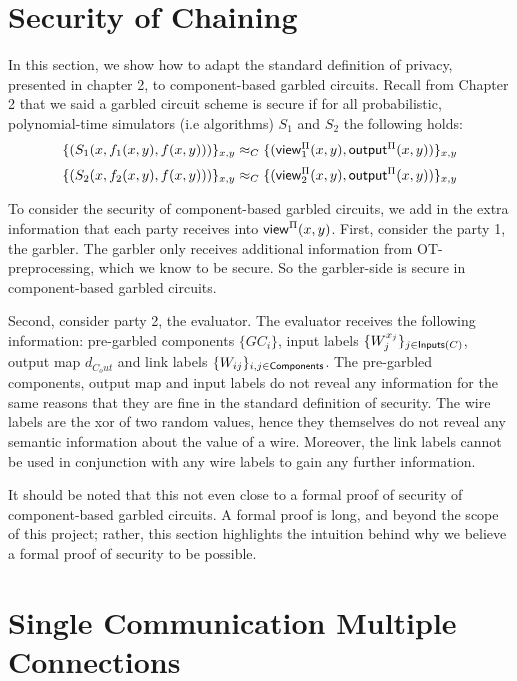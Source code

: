 \section{Security of Chaining}

In this section, we show how to adapt the standard definition of privacy, presented in chapter 2, to component-based garbled circuits.
Recall from Chapter 2 that we said a garbled circuit scheme is secure if for all probabilistic, polynomial-time simulators (i.e algorithms) $S_1$ and $S_2$ the following holds:
\begin{equation}
    \{(S_1(x, f_1(x,y), f(x,y)))\}_{x,y} \approx_C \{({\sf view}^{\Pi}_1(x,y), {\sf output}^{\Pi}(x,y)) \}_{x,y}
\end{equation}
\begin{equation}
    \{(S_2(x, f_2(x,y), f(x,y)))\}_{x,y} \approx_C \{({\sf view}^{\Pi}_2(x,y), {\sf output}^{\Pi}(x,y)) \}_{x,y}
\end{equation}

To consider the security of component-based garbled circuits, we add in the extra information that each party receives into ${\sf view}^{\Pi}(x,y)$. 
First, consider the party 1, the garbler. 
The garbler only receives additional information from OT-preprocessing, which we know to be secure. 
So the garbler-side is secure in component-based garbled circuits.

Second, consider party 2, the evaluator. 
The evaluator receives the following information: pre-garbled components $\{GC_i\}$, input labels $\{W_j^{x_j}\}_{j \in \textsf{Inputs}(C)}$, output map $d_{C_out}$ and link labels $\{W_{ij}\}_{i,j \in \textsf{Components}}$.
The pre-garbled components, output map and input labels do not reveal any information for the same reasons that they are fine in the standard definition of security.
The wire labels are the xor of two random values, hence they themselves do not reveal any semantic information about the value of a wire. 
Moreover, the link labels cannot be used in conjunction with any wire labels to gain any further information.

It should be noted that this not even close to a formal proof of security of component-based garbled circuits. 
A formal proof is long, and beyond the scope of this project; rather, this section highlights the intuition behind why we believe a formal proof of security to be possible. 

\section{Single Communication Multiple Connections}

